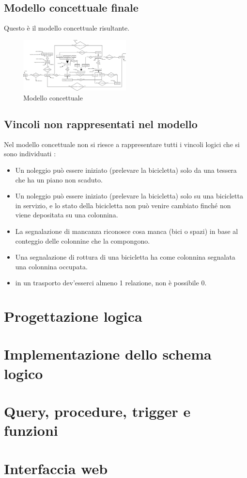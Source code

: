 \documentclass[a4paper,twoside]{article}
\begin{document}
\subsection{Modello concettuale finale}
Questo è il modello concettuale risultante.
\begin{figure}[H]
 \centering
  \includegraphics[width=0.5\textwidth]{Immagini-Grafici/Concettuale14.png}
\caption{Modello concettuale}
\end{figure}

\subsection{Vincoli non rappresentati nel modello}
Nel modello concettuale non si riesce a rappresentare tutti i vincoli logici che si sono individuati :
\begin{itemize} %
 \item Un noleggio può essere iniziato (prelevare la bicicletta) solo da una tessera che ha un piano non scaduto.
 \item Un noleggio può essere iniziato (prelevare la bicicletta) solo su una bicicletta in servizio, e lo stato della bicicletta non può venire cambiato finché non viene depositata su una colonnina.
 \item La segnalazione di mancanza riconosce cosa manca (bici o spazi) in base al conteggio delle colonnine che la compongono.
 \item Una segnalazione di rottura di una bicicletta ha come colonnina segnalata una colonnina occupata.
 \item in un trasporto dev'esserci almeno 1 relazione, non è possibile 0.
\end{itemize}

\section{Progettazione logica}

\section{Implementazione dello schema logico}

\section{Query, procedure, trigger e funzioni}

\section{Interfaccia web}
\end{document}
